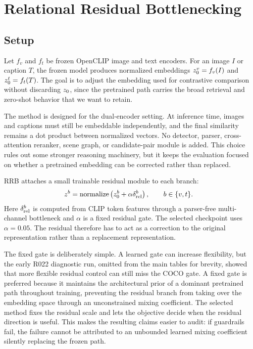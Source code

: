 \section{Relational Residual Bottlenecking}

\subsection{Setup}

Let $f_v$ and $f_t$ be frozen OpenCLIP image and text encoders. For an image $I$ or caption $T$, the frozen model produces normalized embeddings $z_0^v=f_v(I)$ and $z_0^t=f_t(T)$. The goal is to adjust the embedding used for contrastive comparison without discarding $z_0$, since the pretrained path carries the broad retrieval and zero-shot behavior that we want to retain.

The method is designed for the dual-encoder setting. At inference time, images and captions must still be embeddable independently, and the final similarity remains a dot product between normalized vectors. No detector, parser, cross-attention reranker, scene graph, or candidate-pair module is added. This choice rules out some stronger reasoning machinery, but it keeps the evaluation focused on whether a pretrained embedding can be corrected rather than replaced.

RRB attaches a small trainable residual module to each branch:
\begin{equation}
    z^b = \mathrm{normalize}\left(z_0^b + \alpha \delta_{\mathrm{rel}}^b\right), \qquad b \in \{v,t\}.
    \label{eq:rrb}
\end{equation}
Here $\delta_{\mathrm{rel}}^b$ is computed from CLIP token features through a parser-free multi-channel bottleneck and $\alpha$ is a fixed residual gate. The selected checkpoint uses $\alpha=0.05$. The residual therefore has to act as a correction to the original representation rather than a replacement representation.

The fixed gate is deliberately simple. A learned gate can increase flexibility, but the early R022 diagnostic run, omitted from the main tables for brevity, showed that more flexible residual control can still miss the COCO gate. A fixed gate is preferred because it maintains the architectural prior of a dominant pretrained path throughout training, preventing the residual branch from taking over the embedding space through an unconstrained mixing coefficient. The selected method fixes the residual scale and lets the objective decide when the residual direction is useful. This makes the resulting claims easier to audit: if guardrails fail, the failure cannot be attributed to an unbounded learned mixing coefficient silently replacing the frozen path.

